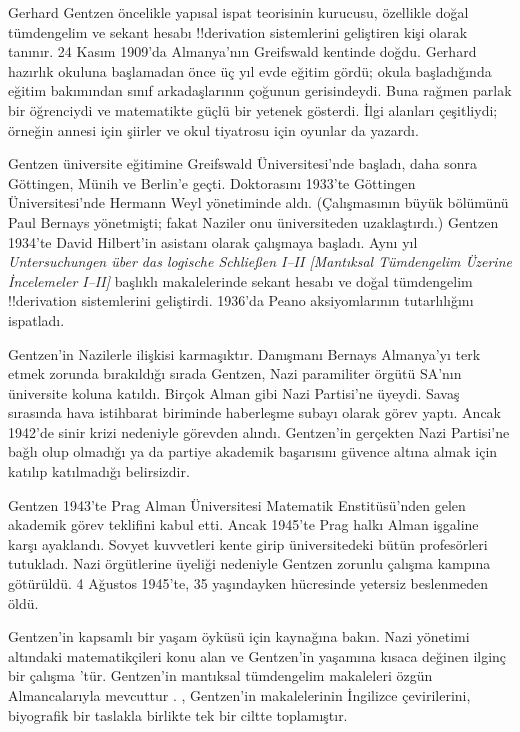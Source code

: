 \documentclass[../../../include/open-logic-section]{subfiles}
\begin{document}



Gerhard Gentzen öncelikle yapısal ispat teorisinin kurucusu, özellikle doğal
tümdengelim ve sekant hesabı !!{derivation} sistemlerini geliştiren kişi
olarak tanınır. 24 Kasım 1909'da Almanya'nın Greifswald kentinde doğdu.
Gerhard hazırlık okuluna başlamadan önce üç yıl evde eğitim gördü; okula
başladığında eğitim bakımından sınıf arkadaşlarının çoğunun gerisindeydi.
Buna rağmen parlak bir öğrenciydi ve matematikte güçlü bir yetenek gösterdi.
İlgi alanları çeşitliydi; örneğin annesi için şiirler ve okul tiyatrosu için
oyunlar da yazardı.

Gentzen üniversite eğitimine Greifswald Üniversitesi'nde başladı, daha sonra
Göttingen, Münih ve Berlin'e geçti. Doktorasını 1933'te Göttingen
Üniversitesi'nde Hermann Weyl yönetiminde aldı. (Çalışmasının büyük bölümünü
Paul Bernays yönetmişti; fakat Naziler onu üniversiteden uzaklaştırdı.)
Gentzen 1934'te David Hilbert'in asistanı olarak çalışmaya başladı. Aynı yıl
\emph{Untersuchungen über das logische Schließen I--II [Mantıksal
Tümdengelim Üzerine İncelemeler I--II]} başlıklı makalelerinde sekant hesabı
ve doğal tümdengelim !!{derivation} sistemlerini geliştirdi. 1936'da Peano
aksiyomlarının tutarlılığını ispatladı.

Gentzen'in Nazilerle ilişkisi karmaşıktır. Danışmanı Bernays Almanya'yı terk
etmek zorunda bırakıldığı sırada Gentzen, Nazi paramiliter örgütü SA'nın
üniversite koluna katıldı. Birçok Alman gibi Nazi Partisi'ne üyeydi. Savaş
sırasında hava istihbarat biriminde haberleşme subayı olarak görev yaptı.
Ancak 1942'de sinir krizi nedeniyle görevden alındı. Gentzen'in gerçekten
Nazi Partisi'ne bağlı olup olmadığı ya da partiye akademik başarısını güvence
altına almak için katılıp katılmadığı belirsizdir.

Gentzen 1943'te Prag Alman Üniversitesi Matematik Enstitüsü'nden gelen
akademik görev teklifini kabul etti. Ancak 1945'te Prag halkı Alman işgaline
karşı ayaklandı. Sovyet kuvvetleri kente girip üniversitedeki bütün
profesörleri tutukladı. Nazi örgütlerine üyeliği nedeniyle Gentzen zorunlu
çalışma kampına götürüldü. 4 Ağustos 1945'te, 35 yaşındayken hücresinde
yetersiz beslenmeden öldü.

\begin{reading}
Gentzen'in kapsamlı bir yaşam öyküsü için \citet{Menzler-Trott2007}
kaynağına bakın. Nazi yönetimi altındaki matematikçileri konu alan ve
Gentzen'in yaşamına kısaca değinen ilginç bir çalışma
\citet{Segal2014}'tür. Gentzen'in mantıksal tümdengelim makaleleri özgün
Almancalarıyla mevcuttur \citep{Gentzen1935a,Gentzen1935b}.
\citet{Gentzen1969}, Gentzen'in makalelerinin İngilizce çevirilerini,
biyografik bir taslakla birlikte tek bir ciltte toplamıştır.
\end{reading}
\end{document}
